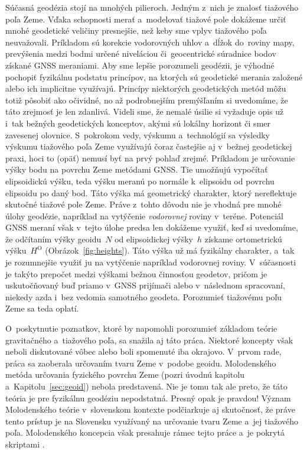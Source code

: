 \documentclass[a4paper, 12pt]{book}
\begin{document}
Súčasná geodézia stojí na mnohých pilieroch.  Jedným z~nich je znalosť 
tiažového poľa Zeme.  Vďaka schopnosti merať a~modelovať tiažové pole dokážeme 
určiť mnohé geodetické veličiny presnejšie, než keby sme vplyv tiažového poľa 
neuvažovali.  Príkladom sú korekcie vodorovných uhlov a~dĺžok do~roviny mapy, 
prevýšenia medzi bodmi určené niveláciou či~geocentrické súradnice bodov 
získané GNSS meraniami.  Aby sme lepšie porozumeli geodézii, je výhodné 
pochopiť fyzikálnu podstatu princípov, na ktorých sú geodetické merania 
založené alebo ich implicitne využívajú.  Princípy niektorých geodetických 
metód môžu totiž pôsobiť ako očividné, no až podrobnejším premýšľaním si 
uvedomíme, že táto zrejmosť je len zdanlivá.  Videli sme, že nemalé úsilie si 
vyžaduje opis už i~tak bežných geodetických konceptov, akými sú lokálny 
horizont či smer zavesenej olovnice.  S~pokrokom vedy, výskumu a~technológií sa 
výsledky výskumu tiažového poľa Zeme využívajú čoraz častejšie aj v~bežnej 
geodetickej praxi, hoci to (opäť) nemusí byť na prvý pohlaď zrejmé.  Príkladom 
je určovanie výšky bodu na povrchu Zeme metódami GNSS.  Tie umožňujú vypočítať 
elipsoidickú výšku, teda výšku meranú po normále k~elipsoidu od povrchu 
elipsoidu po daný bod.  Táto výška má geometrický charakter, ktorý nereflektuje 
skutočné tiažové pole Zeme.  Práve z~tohto dôvodu nie je vhodná pre mnohé úlohy 
geodézie, napríklad na vytýčenie \emph{vodorovnej} roviny v~teréne.  Potenciál 
GNSS meraní však v~tejto úlohe predsa len dokážeme využiť, keď si uvedomíme, že 
odčítaním výšky geoidu~$N$ od elipsoidickej výšky~$h$ získame ortometrickú 
výšku~$H^\mathrm{O}$ (Obrázok~\ref{fig:heights}).  Táto výška už má fyzikálny 
charakter, a~tak je rozumnejšie využiť ju na vytýčenie napríklad vodorovnej 
roviny.  V~súčasnosti je takýto prepočet medzi výškami bežnou činnosťou 
geodetov, pričom je uskutočňovaný buď priamo v~GNSS prijímači alebo v~následnom 
spracovaní, niekedy azda i~bez vedomia samotného geodeta.  Porozumieť tiažovému 
poľu Zeme sa teda oplatí.

O~poskytnutie poznatkov, ktoré by napomohli porozumieť základom teórie 
gravitačného a~tiažového poľa, sa snažila aj táto práca.  Niektoré koncepty 
však neboli diskutované vôbec alebo boli spomenuté iba okrajovo.  V~prvom rade, 
práca sa zaoberala určovaním tvaru Zeme v~podobe geoidu.  Molodenského metóda 
určovania fyzického povrchu Zeme (pozri úvodnú kapitolu 
a~Kapitolu~\ref{sec:geoid}) nebola predstavená.  Nie je tomu tak ale preto, že 
táto teória je pre fyzikálnu geodéziu nepodstatná.  Presný opak je pravdou!  
Význam Molodenského teórie v~slovenskom kontexte podčiarkuje aj skutočnosť, že 
práve tento prístup je na Slovensku využívaný na určovanie tvaru Zeme a~jej 
tiažového poľa.  Molodenského koncepcia však presahuje rámec tejto práce a~je 
pokrytá skriptami \textcite{Janak2006}.
\end{document}
